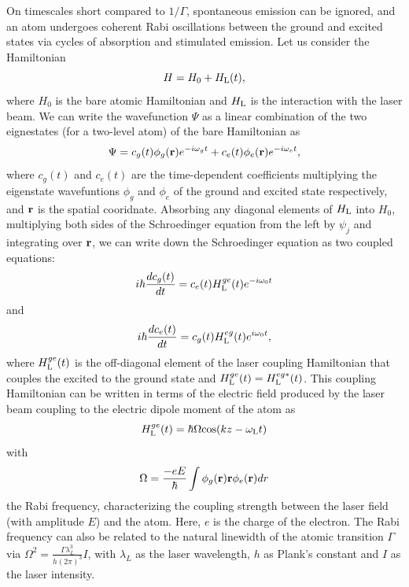 On timescales short compared to $1/\Gamma$, spontaneous emission can be ignored, and an atom undergoes coherent Rabi oscillations between the ground and excited states via cycles of absorption and stimulated emission\cite{LCT}.  Let us consider the Hamiltonian 
\begin{equation}
H=H_0 + H_{\rm L}(t),
\end{equation}
where $H_0$ is the bare atomic Hamiltonian and $H_{\rm L}$ is the interaction with the laser beam. We can write the wavefunction $\Psi$ as a linear combination of the two eignestates (for a two-level atom) of the bare Hamiltonian as 
\begin{equation}
\Psi = c_g(t)\phi_g ({\bf r})e^{-i\omega_g t} + c_e(t)\phi_e ({\bf r})e^{-i\omega_e t},
\end{equation}
where $c_g(t)$ and $c_e(t)$ are the time-dependent coefficients multiplying the eigenstate wavefuntions $\phi_g$ and $\phi_e$ of the ground and excited state respectively, and ${\bf r}$ is the spatial cooridnate. Absorbing any diagonal elements of $H_{\rm L}$ into $H_0$, multiplying both sides of the Schroedinger equation from the left by $\psi_j$ and integrating over ${\bf r}$, we can write down the Schroedinger equation as two coupled equations:
\begin{equation}
i\hbar\frac{dc_g(t)}{dt} = c_e(t) H_{\rm L}^{ge}(t)e^{-i\omega_0t}
\end{equation}
and 
\begin{equation}
i\hbar\frac{dc_e(t)}{dt} = c_g(t) H_{\rm L}^{eg}(t)e^{i\omega_0t},
\end{equation}
where $ H_{\rm L}^{ge}(t)$ is the off-diagonal element of the laser coupling Hamiltonian that couples the excited to the ground state and  $H_{\rm L}^{ge}(t)= H_{\rm L}^{eg*}(t)$. This coupling Hamiltonian can be written in terms of the electric field produced by the laser beam coupling to the electric dipole moment of the atom as
\begin{equation}
 H_{\rm L}^{ge}(t) = \hbar \Omega {\rm cos}(kz - \omega_{\rm L} t)
\end{equation}
with
\begin{equation}
\Omega = \frac{-eE}{\hbar}\int \phi_g({\bf r}) {\bf r} \phi_e ({\bf r}) dr
\end{equation}
the Rabi frequency, characterizing the coupling strength between the laser field (with amplitude $E$) and the atom. Here, $e$ is the charge of the electron. The Rabi frequency can also be related to the natural linewidth of the atomic transition $\Gamma$ via $\Omega^2 = \frac{\Gamma\lambda_L^3}{h(2\pi)^3}I$, with $\lambda_L$ as the laser wavelength, $h$ as Plank's constant and $I$ as the laser intensity.

